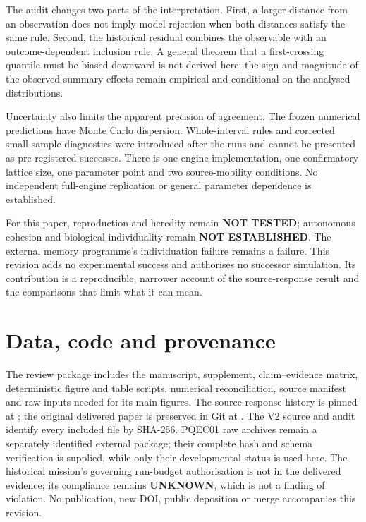 \documentclass[11pt]{article}
\begin{document}
The audit changes two parts of the interpretation. First, a larger distance from an observation
does not imply model rejection when both distances satisfy the same rule.
Second, the historical residual combines the observable with an outcome-dependent inclusion
rule. A general theorem that a first-crossing quantile must be biased downward is not derived
here; the sign and magnitude of the observed summary effects remain empirical and conditional
on the analysed distributions.

Uncertainty also limits the apparent precision of agreement. The frozen numerical predictions
have Monte Carlo dispersion. Whole-interval rules and corrected small-sample diagnostics
were introduced after the runs and cannot be presented as pre-registered successes.
There is one engine implementation, one confirmatory lattice size, one parameter point and
two source-mobility conditions. No independent full-engine replication or general
parameter dependence is established.

For this paper, reproduction and heredity remain \textbf{NOT TESTED}; autonomous cohesion
and biological individuality remain \textbf{NOT ESTABLISHED}.
The external memory programme's individuation failure remains a failure.
This revision adds no experimental success and authorises no successor simulation.
Its contribution is a reproducible, narrower account of the source-response result and the
comparisons that limit what it can mean.

\section*{Data, code and provenance}
The review package includes the manuscript, supplement, claim--evidence matrix, deterministic
figure and table scripts, numerical reconciliation, source manifest and raw inputs needed
for its main figures. The source-response history is pinned at
; the original delivered paper is preserved in
Git at . The V2 source and audit identify every included file by SHA-256.
PQEC01 raw archives remain a separately identified external package; their complete hash and
schema verification is supplied, while only their developmental status is used here.
The historical mission's governing run-budget authorisation is not in the delivered evidence;
its compliance remains \textbf{UNKNOWN}, which is not a finding of violation.
No publication, new DOI, public deposition or merge accompanies this revision.



\end{document}
